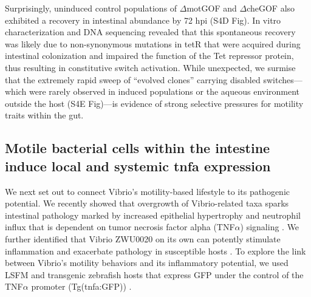 Surprisingly, uninduced control populations of $\Delta$motGOF and $\Delta$cheGOF also exhibited a recovery in intestinal abundance by 72 hpi (S4D Fig). In vitro characterization and DNA sequencing revealed that this spontaneous recovery was likely due to non-synonymous mutations in tetR that were acquired during intestinal colonization and impaired the function of the Tet repressor protein, thus resulting in constitutive switch activation. While unexpected, we surmise that the extremely rapid sweep of ``evolved clones'' carrying disabled switches—which were rarely observed in induced populations or the aqueous environment outside the host (S4E Fig)—is evidence of strong selective pressures for motility traits within the gut. 


\subsection{Motile bacterial cells within the intestine induce local and systemic tnfa expression}
We next set out to connect Vibrio's motility-based lifestyle to its pathogenic potential. We recently showed that overgrowth of Vibrio-related taxa sparks intestinal pathology marked by increased epithelial hypertrophy and neutrophil influx that is dependent on tumor necrosis factor alpha (TNF$\alpha$) signaling \cite{rolig_enteric_2017}. We further identified that Vibrio ZWU0020 on its own can potently stimulate inflammation \cite{rolig_individual_2015} and exacerbate pathology in susceptible hosts \cite{rolig_enteric_2017}. To explore the link between Vibrio's motility behaviors and its inflammatory potential, we used LSFM and transgenic zebrafish hosts that express GFP under the control of the TNF$\alpha$ promoter (Tg(tnfa:GFP)) \cite{marjoram_epigenetic_2015}. 

